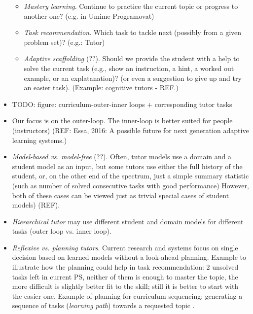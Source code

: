 \begin{itemize}
\begin{itemize}
\item \emph{Mastery learning}.
  Continue to practice the current topic or progress to another one?
  (e.g. in Umime Programovat)
\item \emph{Task recommendation}.
  Which task to tackle next (possibly from a given problem set)?
 (e.g.: Tutor)
\item \emph{Adaptive scaffolding} (??).
  Should we provide the student with a help to solve the current task
  (e.g., show an instruction, a hint, a worked out example, or an explatanation)?
  (or even a suggestion to give up and try an easier task).
  (Example: cognitive tutors - REF.)
\end{itemize}
\item TODO: figure: curriculum-outer-inner loops + corresponding tutor tasks

\item Our focus is on the outer-loop.
  The inner-loop is better suited for people (instructors)
  (REF: Essa, 2016: A possible future for next generation adaptive learning
  systems.)

\item \emph{Model-based vs. model-free} (??).  %
  Often, tutor models use a domain and a student model as an input, but some
  tutors use either the full history of the student, or, on the other end of
  the spectrum, just a simple summary statistic (such as number of solved
  consecutive tasks with good performance) However, both of these cases can be
  viewed just as trivial special cases of student models) (REF).

\item \emph{Hierarchical tutor} may use different student and domain models
  for different tasks (outer loop vs. inner loop).

\item \emph{Reflexive vs. planning tutors}.
Current research and systems focus on single decision based on learned models
without a look-ahead planning.  %
Example to illustrate how the planning could help in task recommendation:
2 unsolved tasks left in current PS, neither of them is enough to master the topic,
the more difficult is slightly better fit to the skill; still it is better to
start with the easier one.
Example of planning for curriculum sequencing: generating a sequence of tasks
(\emph{learning path}) towards a requested topic \cite{its-programming}.


\end{itemize}
